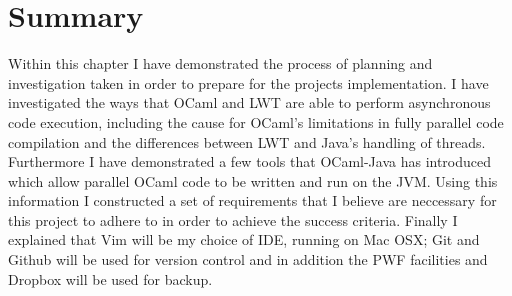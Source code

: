 \documentclass[12pt,twoside,notitlepage]{report}
\begin{document}
\section{Summary}
\label{sec:preparation_summary}
%
%
Within this chapter I have demonstrated the process of planning and investigation taken in order to prepare for the projects implementation. I have investigated the ways that OCaml and LWT are able to perform asynchronous code
execution, including the cause for OCaml's limitations in fully parallel code compilation and the differences between LWT and Java's handling of threads. Furthermore I have demonstrated a few tools that OCaml-Java has introduced which
allow parallel OCaml code to be written and run on the JVM. Using this information I constructed a set of requirements that I believe are neccessary for this project to adhere to in order to achieve the success criteria. Finally I
explained that Vim will be my choice of IDE, running on Mac OSX; Git and Github will be used for version control and in addition the PWF facilities and Dropbox will be used for backup.
\end{document}
